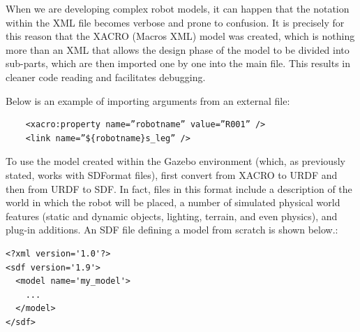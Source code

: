 When we are developing complex robot models, it can happen that the notation within the XML file becomes verbose and prone to confusion.
It is precisely for this reason that the XACRO (Macros XML) model was created, which is nothing more than an XML  that allows the design phase of the model to be divided into sub-parts, which are then imported one by one into the main file. 
This results in cleaner code reading and facilitates debugging.

Below is an example of importing arguments from an external file:
\begin{verbatim}
    <xacro:property name=”robotname” value=”R001” />
    <link name=”${robotname}s_leg” />
\end{verbatim}

To use the model created within the Gazebo environment (which, as previously stated, works with SDFormat files), first convert from XACRO to URDF and then from URDF to SDF. In fact, files in this format include a description of the world in which the robot will be placed, a number of simulated physical world features (static and dynamic objects, lighting, terrain, and even physics), and plug-in additions.
An SDF file defining a model from scratch is shown below.:

\begin{verbatim}
<?xml version='1.0'?>
<sdf version='1.9'>
  <model name='my_model'>
    ...
  </model>
</sdf>
\end{verbatim}





